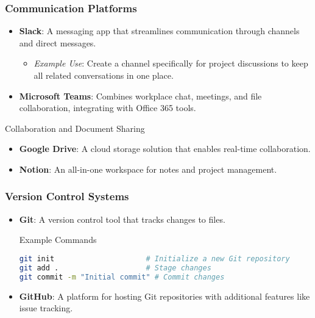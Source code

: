 \documentclass[aspectratio=169]{beamer}
\begin{document}
\begin{frame}[fragile]
    \frametitle{Communication Platforms}
    \begin{itemize}
        \item \textbf{Slack}: A messaging app that streamlines communication through channels and direct messages.
        \begin{itemize}
            \item \textit{Example Use}: Create a channel specifically for project discussions to keep all related conversations in one place.
        \end{itemize}
        
        \item \textbf{Microsoft Teams}: Combines workplace chat, meetings, and file collaboration, integrating with Office 365 tools.
    \end{itemize}

    \begin{block}{Collaboration and Document Sharing}
        \begin{itemize}
            \item \textbf{Google Drive}: A cloud storage solution that enables real-time collaboration.
            \item \textbf{Notion}: An all-in-one workspace for notes and project management.
        \end{itemize}
    \end{block}
\end{frame}

\begin{frame}[fragile]
    \frametitle{Version Control Systems}
    \begin{itemize}
        \item \textbf{Git}: A version control tool that tracks changes to files.
        \begin{block}{Example Commands}
            \begin{lstlisting}[language=bash]
git init                     # Initialize a new Git repository
git add .                    # Stage changes
git commit -m "Initial commit" # Commit changes
            \end{lstlisting}
        \end{block}
        
        \item \textbf{GitHub}: A platform for hosting Git repositories with additional features like issue tracking.
    \end{itemize}
\end{frame}
\end{document}
